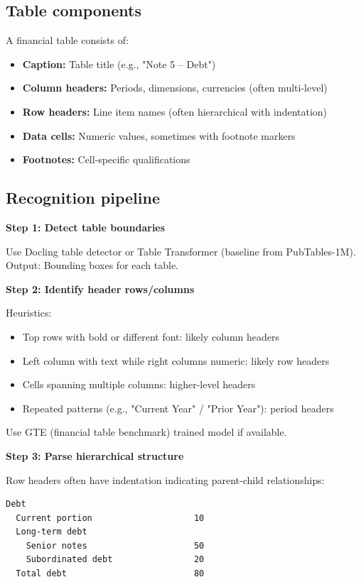 \subsection{Table components}

A financial table consists of:
\begin{itemize}
\item \textbf{Caption:} Table title (e.g., "Note 5 – Debt")
\item \textbf{Column headers:} Periods, dimensions, currencies (often multi-level)
\item \textbf{Row headers:} Line item names (often hierarchical with indentation)
\item \textbf{Data cells:} Numeric values, sometimes with footnote markers
\item \textbf{Footnotes:} Cell-specific qualifications
\end{itemize}

\subsection{Recognition pipeline}

\textbf{Step 1: Detect table boundaries}

Use Docling table detector or Table Transformer (baseline from PubTables-1M).
Output: Bounding boxes for each table.

\textbf{Step 2: Identify header rows/columns}

Heuristics:
\begin{itemize}
\item Top rows with bold or different font: likely column headers
\item Left column with text while right columns numeric: likely row headers
\item Cells spanning multiple columns: higher-level headers
\item Repeated patterns (e.g., "Current Year" / "Prior Year"): period headers
\end{itemize}

Use GTE (financial table benchmark) trained model if available.

\textbf{Step 3: Parse hierarchical structure}

Row headers often have indentation indicating parent-child relationships:

\begin{verbatim}
Debt
  Current portion                    10
  Long-term debt
    Senior notes                     50
    Subordinated debt                20
  Total debt                         80
\end{verbatim}


